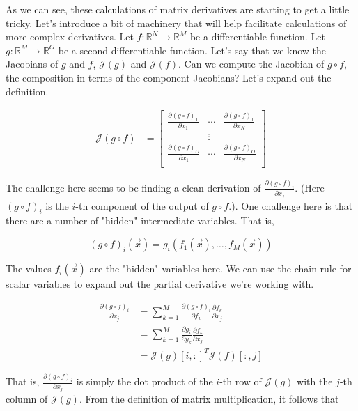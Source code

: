 \documentclass[book.tex]{subfiles}
\begin{document}
As we can see, these calculations of matrix derivatives are starting to get a little tricky. Let's introduce a bit of machinery that will help facilitate calculations of more complex derivatives. Let $f: \mathbb{R}^N \to \mathbb{R}^M$ be a differentiable function. Let $g:\mathbb{R}^M \to \mathbb{R}^O$ be a second differentiable function. Let's say that we know the Jacobians of $g$ and $f$, $\mathcal{J}(g)$ and $\mathcal{J}(f)$. Can we compute the Jacobian of $g \circ f$, the composition in terms of the component Jacobians? Let's expand out the definition.

\begin{align}
    \mathcal{J}(g \circ f) &= \begin{bmatrix}
    \frac{\partial (g \circ f)_1}{\partial x_1} & \cdots & \frac{\partial (g \circ f)_1}{\partial x_N} \\
    & \vdots & \\
    \frac{\partial (g \circ f)_O}{\partial x_1} & \cdots & \frac{\partial (g \circ f)_O}{\partial x_N} \\
    \end{bmatrix}
\end{align}

The challenge here seems to be finding a clean derivation of $\frac{\partial (g \circ f)_i}{\partial x_j}$. (Here $(g\circ f)_i$ is the $i$-th component of the output of $g \circ f$.). One challenge here is that there are a number of "hidden" intermediate variables. That is,

\[ (g \circ f)_i(\vec{x}) = g_i(f_1(\vec{x}), \dotsc, f_M(\vec{x})) \]

The values $f_i(\vec{x})$ are the "hidden" variables here. We can use the chain rule for scalar variables to expand out the partial derivative we're working with.

\begin{align}
    \frac{\partial (g \circ f)_i}{\partial x_j} &= \sum_{k=1}^M \frac{\partial (g \circ f)_i}{\partial f_k} \frac{\partial f_k}{\partial x_j} \\
    &= \sum_{k=1}^M \frac{\partial g_i}{\partial y_k} \frac{\partial f_k}{\partial x_j} \\
    &= \mathcal{J}(g)[i, :]^T \mathcal{J}(f)[:, j]
\end{align}

That is, $\frac{\partial (g \circ f)_i}{\partial x_j}$ is simply the dot product of the $i$-th row of $\mathcal{J}(g)$ with the $j$-th column of $\mathcal{J}(g)$. From the definition of matrix multiplication, it follows that
\end{document}
